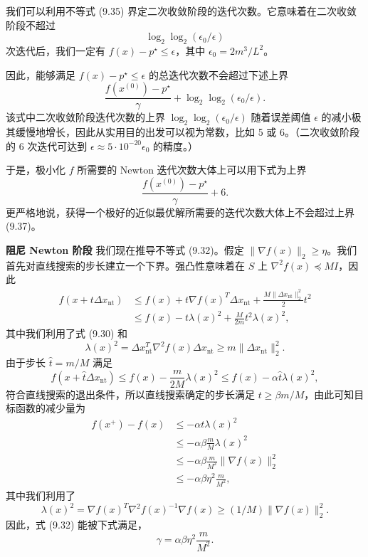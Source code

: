 \documentclass[UTF8,12pt,a4paper,fontset=fandol]{ctexart}
\begin{document}
我们可以利用不等式 (9.35) 界定二次收敛阶段的迭代次数。它意味着在二次收敛阶段不超过
\[
\log_2\log_2(\epsilon_0/\epsilon)
\]
次迭代后，我们一定有 $f(x)-p^\star\leq\epsilon$，其中 $\epsilon_0=2m^3/L^2$。

因此，能够满足 $f(x)-p^\star\leq\epsilon$ 的总迭代次数不会超过下述上界
\begin{equation}
\frac{f(x^{(0)})-p^\star}{\gamma}+\log_2\log_2(\epsilon_0/\epsilon).
\tag{9.36}
\end{equation}
该式中二次收敛阶段迭代次数的上界 $\log_2\log_2(\epsilon_0/\epsilon)$ 随着误差阈值 $\epsilon$ 的减小极其缓慢地增长，因此从实用目的出发可以视为常数，比如 5 或 6。（二次收敛阶段的 6 次迭代可达到 $\epsilon\approx5\cdot10^{-20}\epsilon_0$ 的精度。）

于是，极小化 $f$ 所需要的 Newton 迭代次数大体上可以用下式为上界
\begin{equation}
\frac{f(x^{(0)})-p^\star}{\gamma}+6.
\tag{9.37}
\end{equation}
更严格地说，获得一个极好的近似最优解所需要的迭代次数大体上不会超过上界 (9.37)。

\noindent\textbf{阻尼 Newton 阶段}\quad
我们现在推导不等式 (9.32)。假定 $\|\nabla f(x)\|_2\geq\eta$。我们首先对直线搜索的步长建立一个下界。强凸性意味着在 $S$ 上 $\nabla^2f(x)\preceq MI$，因此
\[
\begin{aligned}
f(x+t\Delta x_{\mathrm{nt}})
&\leq f(x)+t\nabla f(x)^T\Delta x_{\mathrm{nt}}+\frac{M\|\Delta x_{\mathrm{nt}}\|_2^2}{2}t^2\\
&\leq f(x)-t\lambda(x)^2+\frac{M}{2m}t^2\lambda(x)^2,
\end{aligned}
\]
其中我们利用了式 (9.30) 和
\[
\lambda(x)^2=\Delta x_{\mathrm{nt}}^T\nabla^2f(x)\Delta x_{\mathrm{nt}}\geq m\|\Delta x_{\mathrm{nt}}\|_2^2.
\]
由于步长 $\hat{t}=m/M$ 满足
\[
f(x+\hat{t}\Delta x_{\mathrm{nt}})\leq f(x)-\frac{m}{2M}\lambda(x)^2\leq f(x)-\alpha\hat{t}\lambda(x)^2,
\]
符合直线搜索的退出条件，所以直线搜索确定的步长满足 $t\geq\beta m/M$，由此可知目标函数的减少量为
\[
\begin{aligned}
f(x^+)-f(x)
&\leq -\alpha t\lambda(x)^2\\
&\leq -\alpha\beta\frac{m}{M}\lambda(x)^2\\
&\leq -\alpha\beta\frac{m}{M^2}\|\nabla f(x)\|_2^2\\
&\leq -\alpha\beta\eta^2\frac{m}{M^2},
\end{aligned}
\]
其中我们利用了
\[
\lambda(x)^2=\nabla f(x)^T\nabla^2f(x)^{-1}\nabla f(x)\geq(1/M)\|\nabla f(x)\|_2^2.
\]
因此，式 (9.32) 能被下式满足，
\begin{equation}
\gamma=\alpha\beta\eta^2\frac{m}{M^2}.
\tag{9.38}
\end{equation}
\end{document}
